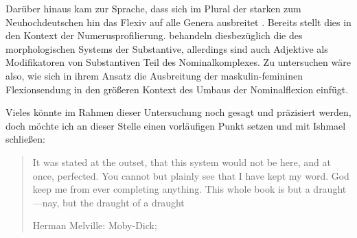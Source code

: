 Darüber hinaus kam zur Sprache, dass sich im Plural der starken
 zum Neuhochdeutschen hin das
Flexiv  auf alle Genera ausbreitet
\autocite[vgl.][191--192]{reichmannwegera1993}. Bereits \citet{askedal1973}
stellt dies in den Kontext der Numerusprofilierung. \citet{dammelgillmann2014} behandeln diesbezüglich die 
des morphologischen Systems der Substantive, allerdings sind
auch Adjektive als Modifikatoren von
Substantiven Teil des Nominalkomplexes. Zu untersuchen wäre also, wie sich in
ihrem Ansatz die Ausbreitung der maskulin-femininen Flexionsendung in den
größeren Kontext des Umbaus der Nominal\-flexion einfügt.


Vieles könnte im Rahmen dieser Untersuchung noch gesagt und präzisiert werden,
doch möchte ich an dieser Stelle einen vorläufigen Punkt setzen und mit Ishmael
schließen: \foreignblockquote{english}[{Herman Melville: Moby-Dick;
\cite[159]{melville:mobydick}}]{It was stated at the outset, that this system
would not be here, and at once, perfected. You cannot but plainly see that I
have kept my word.
\textelp{}
God keep me from ever completing anything. This whole book is but a
draught---nay, but the draught of a draught}. %
